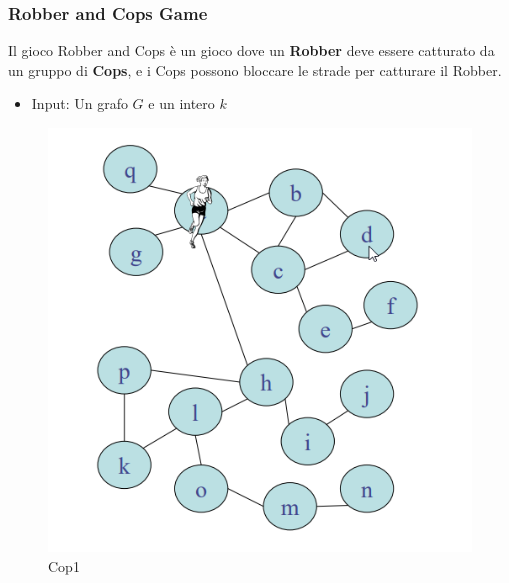 \subsubsection{Robber and Cops Game}

\begin{definition}
    Il gioco Robber and Cops è un gioco dove un \textbf{Robber} deve essere catturato da un gruppo di \textbf{Cops}, e
    i Cops possono bloccare le strade per catturare il Robber.

    \begin{itemize}
        \item Input: Un grafo $G$ e un intero $k$
    \end{itemize}
\end{definition}

\begin{figure}[H]
    \centering
    \begin{minipage}[b]{0.45\linewidth}
        \includegraphics[width=\linewidth]{chapters/images/cop1.png}
        \caption{Cop1}
        \label{fig:5}
    \end{minipage}
    \hspace{0.5cm}
    \begin{minipage}[b]{0.45\linewidth}

\end{minipage}
\end{figure}
